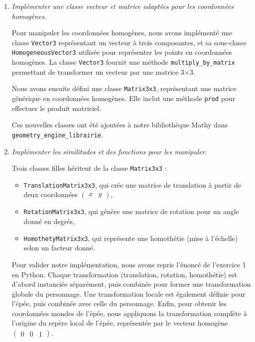 \documentclass[a4paper,12pt]{article}
\begin{document}
\label{exo:impl}
\begin{enumerate}
  \item \emph{Implémenter une classe vecteur et matrice adaptées pour les coordonnées homogènes.}

Pour manipuler les coordonnées homogènes, nous avons implémenté une classe \texttt{Vector3} représentant un vecteur à trois
composantes, et sa sous-classe \texttt{HomogeneousVector3} utilisée pour représenter les points en coordonnées homogènes. La classe \texttt{Vector3} fournit une méthode \texttt{multiply\_by\_matrix} permettant de transformer un vecteur par une matrice 3×3.

Nous avons ensuite défini une classe \texttt{Matrix3x3}, représentant une matrice générique en coordonnées homogènes. Elle inclut une méthode \texttt{prod} pour effectuer le produit matriciel. 

Ces nouvelles classes ont été ajoutées à notre bibliothèque Mathy dans \newline \texttt{geometry\_engine\_librairie}.

  \item \emph{Implémenter les similitudes et des fonctions pour les manipuler.}

Trois classes filles héritent de la classe \texttt{Matrix3x3} :
\begin{itemize}
\item \texttt{TranslationMatrix3x3}, qui crée une matrice de translation à partir de deux coordonnées $\begin{pmatrix} x & y \end{pmatrix}$,
\item \texttt{RotationMatrix3x3}, qui génère une matrice de rotation pour un angle donné en degrés,
\item \texttt{HomothetyMatrix3x3}, qui représente une homothétie (mise à l’échelle) selon un facteur donné.
\end{itemize}

Pour valider notre implémentation, nous avons repris l’énoncé de l’exercice 1 en Python. Chaque transformation (translation, rotation, homothétie) est d’abord instanciée séparément, puis combinée pour former une transformation globale du personnage. Une transformation locale est également définie pour l’épée, puis combinée avec celle du personnage. Enfin, pour obtenir les coordonnées mondes de l’épée, nous appliquons la transformation complète à l’origine du repère local de l’épée, représentée par le vecteur homogène $\begin{pmatrix} 0 & 0 & 1 \end{pmatrix}$.
\end{enumerate}
\end{document}
